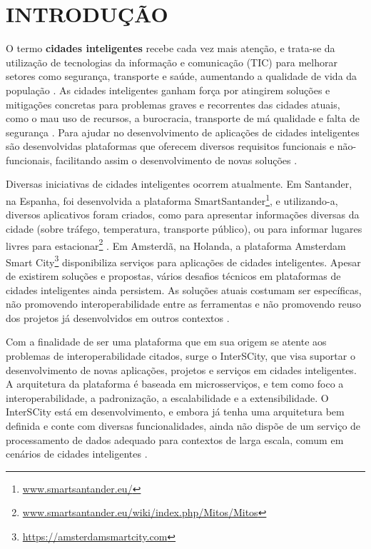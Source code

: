 \chapter[INTRODUÇÃO]{INTRODUÇÃO}
\label{chapter:intro}

O termo \textbf{cidades inteligentes} recebe cada vez mais atenção, e trata-se
da utilização de tecnologias da informação e comunicação (TIC) para melhorar
setores como segurança, transporte e saúde, aumentando a qualidade de vida
da população \cite{batty2012smart}. As cidades inteligentes ganham força por
atingirem soluções e mitigações concretas para problemas graves e recorrentes
das cidades atuais, como o mau uso de recursos, a burocracia, transporte de má
qualidade e falta de segurança \cite{batty2012smart}. Para ajudar no
desenvolvimento de aplicações de cidades inteligentes são desenvolvidas
plataformas que oferecem diversos requisitos funcionais e não-funcionais,
facilitando assim o desenvolvimento de novas soluções \cite{kon2016}.

Diversas iniciativas de cidades inteligentes ocorrem atualmente. Em Santander,
na Espanha, foi desenvolvida a plataforma
SmartSantander\footnote{\url{www.smartsantander.eu/}}, e utilizando-a,
diversos aplicativos foram criados, como para apresentar informações diversas
da cidade (sobre tráfego, temperatura, transporte público), ou para informar
lugares livres para
estacionar\footnote{\url{www.smartsantander.eu/wiki/index.php/Mitos/Mitos}}
\cite{gutierrez2013}. Em Amsterdã, na Holanda, a plataforma Amsterdam Smart
City\footnote{\url{https://amsterdamsmartcity.com}} disponibiliza serviços para
aplicações de cidades inteligentes. Apesar de existirem soluções
e propostas, vários desafios técnicos em plataformas de cidades inteligentes
ainda persistem. As soluções atuais costumam ser específicas, não promovendo
interoperabilidade entre as ferramentas e não promovendo reuso dos projetos já
desenvolvidos em outros contextos \cite{delesposte2017}.

Com a finalidade de ser uma plataforma que em sua origem se atente aos
problemas de interoperabilidade citados, surge o InterSCity, que visa
suportar o desenvolvimento de novas aplicações, projetos e serviços em cidades
inteligentes. A arquitetura da plataforma é baseada em microsserviços, e
tem como foco a interoperabilidade, a padronização, a escalabilidade e
a extensibilidade. O InterSCity está em desenvolvimento, e embora já tenha uma
arquitetura bem definida e conte com diversas funcionalidades, ainda não dispõe
de um serviço de processamento de dados adequado para contextos de larga
escala, comum em cenários de cidades inteligentes \cite{alnuaimi2015}.

